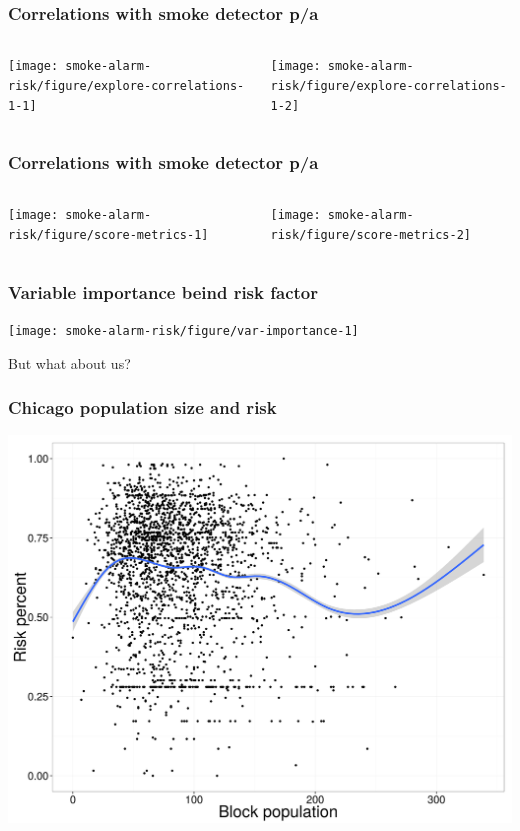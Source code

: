 \documentclass{beamer}
\begin{document}
\begin{frame}
  \frametitle{Correlations with smoke detector p/a}
  \begin{columns}
    \begin{column}{0.5\textwidth}
      \texttt{[image: smoke-alarm-risk/figure/explore-correlations-1-1]}
    \end{column}
    \begin{column}{0.5\textwidth}
      \texttt{[image: smoke-alarm-risk/figure/explore-correlations-1-2]}
    \end{column}
  \end{columns}
\end{frame}

\begin{frame}
  \frametitle{Correlations with smoke detector p/a}
  \begin{columns}
    \begin{column}{0.5\textwidth}
      \texttt{[image: smoke-alarm-risk/figure/score-metrics-1]}
    \end{column}
    \begin{column}{0.5\textwidth}
      \texttt{[image: smoke-alarm-risk/figure/score-metrics-2]}
    \end{column}
  \end{columns}
\end{frame}

\begin{frame}
  \frametitle{Variable importance beind risk factor}
  \begin{center}
    \texttt{[image: smoke-alarm-risk/figure/var-importance-1]}
  \end{center}
\end{frame}

\begin{frame}
  \Large{But what about us?}
\end{frame}

\begin{frame}
  \frametitle{Chicago population size and risk}
  \begin{center}
    \includegraphics[width=\textwidth,height=0.8\textheight,keepaspectratio=true]{pop_risk}
  \end{center}
\end{frame}
\end{document}
